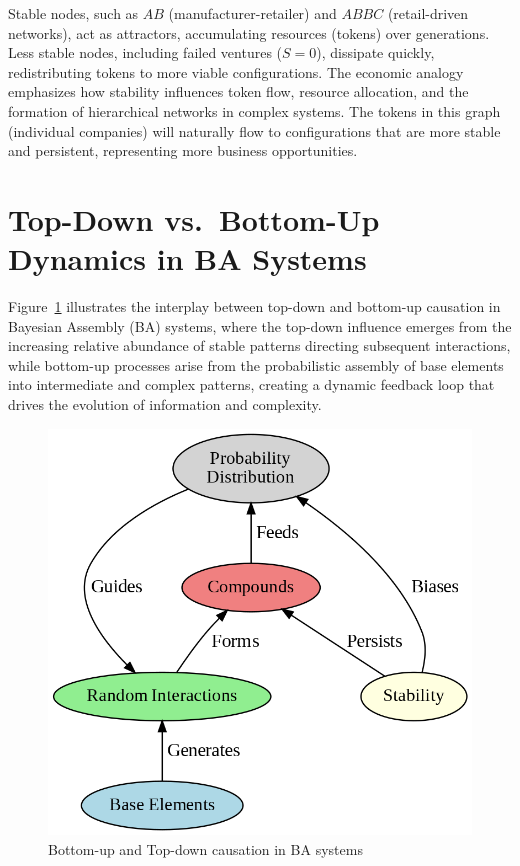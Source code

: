\documentclass[preprint,12pt]{elsarticle}
\begin{document}
Stable nodes, such as \( AB \) (manufacturer-retailer) and \( ABBC \) (retail-driven networks), act as attractors, accumulating resources (tokens) over generations. Less stable nodes, including failed ventures (\( S=0 \)), dissipate quickly, redistributing tokens to more viable configurations. The economic analogy emphasizes how stability influences token flow, resource allocation, and the formation of hierarchical networks in complex systems. The tokens in this graph (individual companies) will naturally flow to configurations that are more stable and persistent, representing more business opportunities.

\section{Top-Down vs.\ Bottom-Up Dynamics in BA Systems}
\label{sec:topdown-bottomup}

Figure~\ref{fig:figure_10} illustrates the interplay between top-down and bottom-up causation in Bayesian Assembly (BA) systems, where the top-down influence emerges from the increasing relative abundance of stable patterns directing subsequent interactions, while bottom-up processes arise from the probabilistic assembly of base elements into intermediate and complex patterns, creating a dynamic feedback loop that drives the evolution of information and complexity.

\begin{figure}[h]
    \centering
    \includegraphics[width=0.7\linewidth,height=0.7\linewidth]{figure_10.png}
    \caption{Bottom-up and Top-down causation in BA systems}
    \label{fig:figure_10}
\end{figure}
\end{document}
